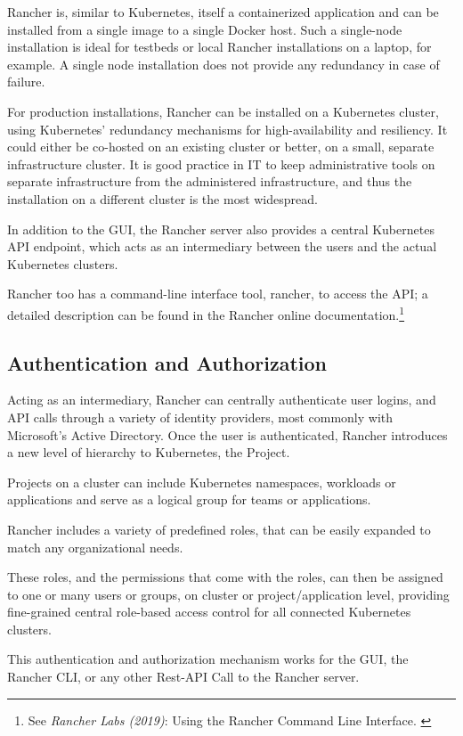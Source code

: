 Rancher is, similar to Kubernetes, itself a containerized application and can be installed from a single image to a single Docker host. Such a single-node installation is ideal for testbeds or local Rancher installations on a laptop, for example. A single node installation does not provide any redundancy in case of failure.

For production installations, Rancher can be installed on a Kubernetes cluster, using Kubernetes' redundancy mechanisms for high-availability and resiliency. It could either be co-hosted on an existing cluster or better, on a small, separate infrastructure cluster. It is good practice in IT to keep administrative tools on separate infrastructure from the administered infrastructure, and thus the installation on a different cluster is the most widespread.

In addition to the GUI, the Rancher server also provides a central Kubernetes API endpoint, which acts as an intermediary between the users and the actual Kubernetes clusters.

Rancher too has a command-line interface tool, rancher, to access the API; a detailed description can be found in the Rancher online documentation.\footnote{See \textit{Rancher Labs (2019)}: Using the Rancher Command Line Interface. \cite{rancherCLI}}

\subsection{Authentication and Authorization}

Acting as an intermediary, Rancher can centrally authenticate user logins, and API calls through a variety of identity providers, most commonly with Microsoft's Active Directory. Once the user is authenticated, Rancher introduces a new level of hierarchy to Kubernetes, the Project.

Projects on a cluster can include Kubernetes namespaces, workloads or applications and serve as a logical group for teams or applications. 

Rancher includes a variety of predefined roles, that can be easily expanded to match any organizational needs.

These roles, and the permissions that come with the roles, can then be assigned to one or many users or groups, on cluster or project/application level, providing fine-grained central role-based access control for all connected Kubernetes clusters.

This authentication and authorization mechanism works for the GUI, the Rancher CLI, or any other Rest-API Call to the Rancher server.

